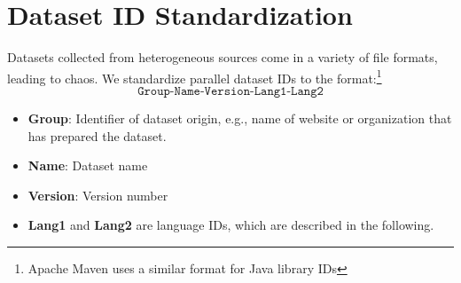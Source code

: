 \section{Dataset ID Standardization}
\label{sec:did-bcp47}

Datasets collected from heterogeneous sources come in a variety of file formats, leading to chaos.  
We standardize parallel dataset IDs to the format:\footnote{Apache Maven uses a similar format for Java library IDs} $$\texttt{Group-Name-Version-Lang1-Lang2}$$
\begin{itemize}
    \item \textbf{Group}: Identifier of dataset origin, e.g., name of website or organization that has prepared the dataset.
    \item \textbf{Name}: Dataset name
    \item \textbf{Version}: Version number
    \item \textbf{Lang1} and \textbf{Lang2} are language IDs, which  are described in the following.
\end{itemize}

